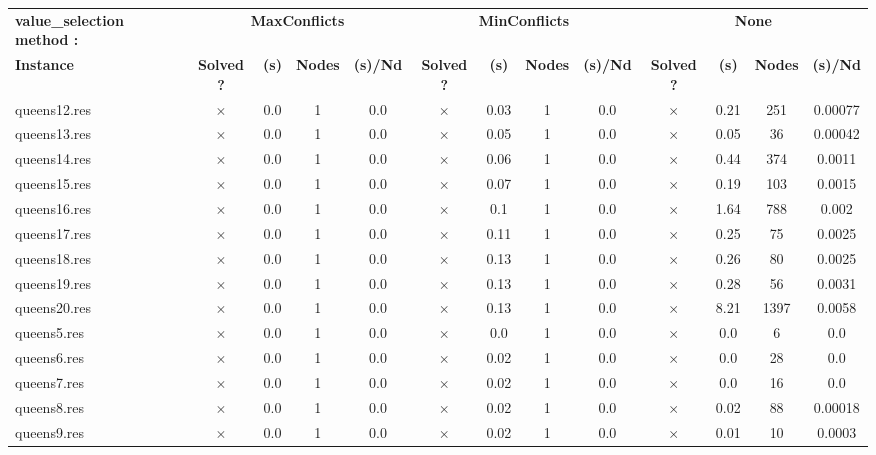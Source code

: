 \documentclass[main.tex]{subfiles}
\begin{document}
\newpage
\begin{landscape}
\begin{center}
\renewcommand{\arraystretch}{1.4} 
\begin{tabular}{|l|cccc|cccc|cccc|}
	\hline
\textbf{value_selection method :} & \multicolumn{4}{c}{\textbf{MaxConflicts}} & \multicolumn{4}{c}{\textbf{MinConflicts}} & \multicolumn{4}{c}{\textbf{None}}\\
\textbf{Instance}  & \textbf{Solved ?} & \textbf{(s)} & \textbf{Nodes} & \textbf{(s)/Nd} & \textbf{Solved ?} & \textbf{(s)} & \textbf{Nodes} & \textbf{(s)/Nd} & \textbf{Solved ?} & \textbf{(s)} & \textbf{Nodes} & \textbf{(s)/Nd}\\\hline

queens12.res & $\times$ & 0.0 & 1 & 0.0
 & $\times$ & 0.03 & 1 & 0.0
 & $\times$ & 0.21 & 251 & 0.00077
\\
queens13.res & $\times$ & 0.0 & 1 & 0.0
 & $\times$ & 0.05 & 1 & 0.0
 & $\times$ & 0.05 & 36 & 0.00042
\\
queens14.res & $\times$ & 0.0 & 1 & 0.0
 & $\times$ & 0.06 & 1 & 0.0
 & $\times$ & 0.44 & 374 & 0.0011
\\
queens15.res & $\times$ & 0.0 & 1 & 0.0
 & $\times$ & 0.07 & 1 & 0.0
 & $\times$ & 0.19 & 103 & 0.0015
\\
queens16.res & $\times$ & 0.0 & 1 & 0.0
 & $\times$ & 0.1 & 1 & 0.0
 & $\times$ & 1.64 & 788 & 0.002
\\
queens17.res & $\times$ & 0.0 & 1 & 0.0
 & $\times$ & 0.11 & 1 & 0.0
 & $\times$ & 0.25 & 75 & 0.0025
\\
queens18.res & $\times$ & 0.0 & 1 & 0.0
 & $\times$ & 0.13 & 1 & 0.0
 & $\times$ & 0.26 & 80 & 0.0025
\\
queens19.res & $\times$ & 0.0 & 1 & 0.0
 & $\times$ & 0.13 & 1 & 0.0
 & $\times$ & 0.28 & 56 & 0.0031
\\
queens20.res & $\times$ & 0.0 & 1 & 0.0
 & $\times$ & 0.13 & 1 & 0.0
 & $\times$ & 8.21 & 1397 & 0.0058
\\
queens5.res & $\times$ & 0.0 & 1 & 0.0
 & $\times$ & 0.0 & 1 & 0.0
 & $\times$ & 0.0 & 6 & 0.0
\\
queens6.res & $\times$ & 0.0 & 1 & 0.0
 & $\times$ & 0.02 & 1 & 0.0
 & $\times$ & 0.0 & 28 & 0.0
\\
queens7.res & $\times$ & 0.0 & 1 & 0.0
 & $\times$ & 0.02 & 1 & 0.0
 & $\times$ & 0.0 & 16 & 0.0
\\
queens8.res & $\times$ & 0.0 & 1 & 0.0
 & $\times$ & 0.02 & 1 & 0.0
 & $\times$ & 0.02 & 88 & 0.00018
\\
queens9.res & $\times$ & 0.0 & 1 & 0.0
 & $\times$ & 0.02 & 1 & 0.0
 & $\times$ & 0.01 & 10 & 0.0003
\\
\hline\end{tabular}
\end{center}
\end{landscape}
\end{document}
